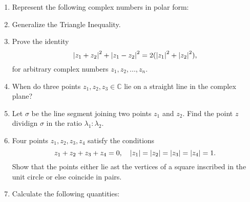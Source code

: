 \documentclass[11pt, oneside]{book}
\begin{document}
\begin{enumerate}
	\item Represent the following complex numbers in polar form:


	\item Generalize the Triangle Inequality.
	\item Prove the identity
	\begin{equation*}
		\left|z_1 + z_2\right|^2 + \left|z_1 - z_2\right|^2 = 2(\left|z_1\right|^2 + \left|z_2\right|^2),
	\end{equation*}
	for arbitrary complex numbers $z_1, z_2, ..., z_n$.

	\item When do three points $z_1, z_2, z_3 \in \mathbb{C}$ lie on a straight line in the complex plane?

	\item Let $\sigma$ be the line segment joining two points $z_1$ and $z_2$. Find the point $z$ dividign $\sigma$ in the ratio $\lambda_1 : \lambda_2$.

	\item Four points $z_1, z_2, z_3, z_4$ satisfy the conditions
	\begin{equation*}
		z_1 + z_2 + z_3 + z_4 = 0, \quad \left|z_1\right| = \left|z_2\right| = \left|z_3\right| = \left|z_4\right| = 1.
	\end{equation*}
	Show that the points either lie ast the vertices of a square inscribed in the unit circle or else coincide in pairs.

	\item Calculate the following quantities:



\end{enumerate}
\end{document}

